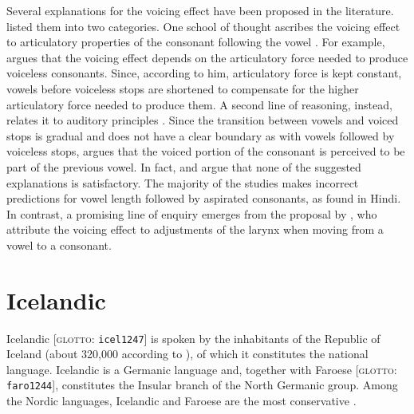 \documentclass[11pt,a4paper,openany]{memoir}\usepackage[]{graphicx}\usepackage[]{color}
\begin{document}
Several explanations for the voicing effect have been proposed in the literature.
\citet{soskuthy2013} listed them into two categories.
One school of thought ascribes the voicing effect to articulatory properties of the consonant following the vowel \citep{belasco1953,chen1970}.
For example, \citep{belasco1953} argues that the voicing effect depends on the articulatory force needed to produce voiceless consonants.
Since, according to him, articulatory force is kept constant, vowels before voiceless stops are shortened to compensate for the higher articulatory force needed to produce them.
A second line of reasoning, instead, relates it to auditory principles \citep{javkin1976,kluender1988}.
Since the transition between vowels and voiced stops is gradual and does not have a clear boundary as with vowels followed by voiceless stops, \citep{javkin1976} argues that the voiced portion of the consonant is perceived to be part of the previous vowel.
In fact, \citet{maddieson1976} and \citet{durvasula2012} argue that none of the suggested explanations is satisfactory.
The majority of the studies makes incorrect predictions for vowel length followed by aspirated consonants, as found in Hindi.
In contrast, a promising line of enquiry emerges from the proposal by \citet{chomsky1968}, who attribute the voicing effect to adjustments of the larynx when moving from a vowel to a consonant.


\section{Icelandic}
\label{s:icelandic}


Icelandic [\textsc{glotto}: \texttt{icel1247}] is spoken by the inhabitants of the Republic of Iceland (about 320,000 according to \citealt{arnason2011}), of which it constitutes the national language.
Icelandic is a Germanic language and, together with Faroese [\textsc{glotto}: \texttt{faro1244}], constitutes the Insular branch of the North Germanic group.
Among the Nordic languages, Icelandic and Faroese are the most conservative \citep{harbert2006,konig2013}.
\end{document}
